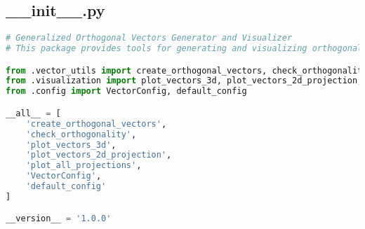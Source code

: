 \subsection{\_\_init\_\_.py}

\begin{lstlisting}[language=Python]
# Generalized Orthogonal Vectors Generator and Visualizer
# This package provides tools for generating and visualizing orthogonal vectors

from .vector_utils import create_orthogonal_vectors, check_orthogonality
from .visualization import plot_vectors_3d, plot_vectors_2d_projection, plot_all_projections
from .config import VectorConfig, default_config

__all__ = [
    'create_orthogonal_vectors',
    'check_orthogonality',
    'plot_vectors_3d',
    'plot_vectors_2d_projection',
    'plot_all_projections',
    'VectorConfig',
    'default_config'
]

__version__ = '1.0.0'
\end{lstlisting}
